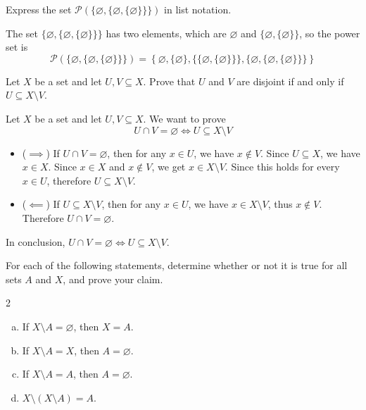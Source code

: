 \begin{chapex}
Express the set $\mathcal{P}(\{ \varnothing, \{ \varnothing, \{ \varnothing \} \} \})$ in list notation.
\end{chapex}

\begin{mysolution}
    The set $\{ \varnothing, \{ \varnothing, \{ \varnothing \} \} \}$ has two elements, which are $\varnothing$ and $\{ \varnothing, \{ \varnothing \} \}$, so the power set is
    \[
    \mathcal P\left(\{\varnothing,\{\varnothing,\{\varnothing\}\}\}\right)
    =
    \left\{
    \varnothing,
    \{\varnothing\},
    \{\{\varnothing,\{\varnothing\}\}\},
    \{\varnothing,\{\varnothing,\{\varnothing\}\}\}
    \right\}
    \]
\end{mysolution}

\begin{chapex}
Let $X$ be a set and let $U, V \subseteq X$. Prove that $U$ and $V$ are disjoint if and only if $U \subseteq X \setminus V$.
\end{chapex}

\begin{myproof}
    Let $X$ be a set and let $U, V \subseteq X$. We want to prove
    \[U \cap V = \varnothing \iff U \subseteq X \setminus V\]
    \begin{itemize}
    \item ($\implies$) If $U \cap V = \varnothing$, then for any $x \in U$, we have $x \notin V$. Since $U \subseteq X$, we have $x \in X$. Since $x \in X$ and $x \notin V$, we get $x \in X \setminus V$. Since this holds for every $x \in U$, therefore $U \subseteq X \setminus V$.

    \item ($\impliedby$) If $U \subseteq X \setminus V$, then for any $x \in U$, we have $x \in X \setminus V$, thus $x \notin V$. Therefore $U \cap V = \varnothing$.
    \end{itemize}
    In conclusion, $U \cap V = \varnothing \iff U \subseteq X \setminus V$.
\end{myproof}

\begin{chapex}
For each of the following statements, determine whether or not it is true for all sets $A$ and $X$, and prove your claim.
\begin{multicols}{2}
\begin{enumerate}[(a)]
\item If $X \setminus A = \varnothing$, then $X = A$.
\item If $X \setminus A = X$, then $A = \varnothing$.
\item If $X \setminus A = A$, then $A = \varnothing$.
\item $X \setminus (X \setminus A) = A$.
\end{enumerate}
\end{multicols}
\end{chapex}

